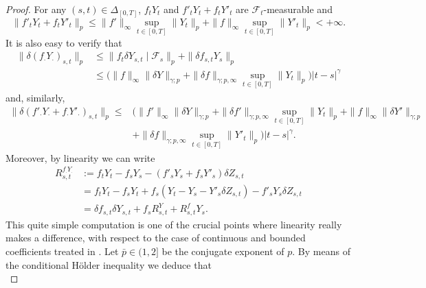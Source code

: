 \documentclass[11pt,a4paper]{article}
\theoremstyle{plain}
\begin{document}
\begin{proof} For any $(s,t) \in \Delta_{[0,T]}$, $f_tY_t$ and $f'_tY_t+f_tY'_t$ are $\mathcal{F}_t$-measurable and
\begin{equation} \label{eq:esttimateforapriori1}
    \|f'_tY_t+f_tY'_t\|_p \le \|f'\|_\infty \sup_{t\in [0,T]}\|Y_t\|_p + \|f\|_\infty \sup_{t\in [0,T]}\|Y'_t\|_p < +\infty.
\end{equation} 
It is also easy to verify that \begin{equation}\begin{aligned} \label{eq:esttimateforapriori2}
     \|\delta(f_\cdot Y_\cdot)_{s,t} \|_p &\le \|f_t\delta Y_{s,t} \mid \mathcal{F}_s \|_p + \|\delta f_{s,t} Y_s\|_p \\ &\le \big(\|f\|_\infty \|\delta Y\|_{\gamma;p}  + \|\delta f\|_{\gamma;p,\infty} \sup_{t\in [0,T]}\|Y_t\|_p\big) |t-s|^\gamma
\end{aligned}
\end{equation} and, similarly, \begin{equation} \label{eq:esttimateforapriori3}
    \begin{aligned}
        \|\delta(f'_\cdot Y_\cdot + f_\cdot Y'_\cdot)_{s,t}\|_p 
        \le & \Big(\|f'\|_\infty \|\delta Y\|_{\gamma;p} + \|\delta f'\|_{\gamma;p,\infty} \sup_{t\in [0,T]}\|Y_t\|_p +  \|f\|_\infty \|\delta Y'\|_{\gamma;p}  \\ & + \|\delta f\|_{\gamma;p,\infty} \sup_{t\in [0,T]}\|Y'_t\|_p\Big) |t-s|^\gamma.
    \end{aligned}
\end{equation} Moreover, by linearity we can write \begin{equation} \label{eq:remaindercompositionwithstochasticcontrolledlinearvectorfields}
    \begin{aligned}
        R_{s,t}^{f_\cdot Y_\cdot}&:= f_tY_t-f_sY_s-(f'_s Y_s+f_sY'_s)\delta Z_{s,t} \\ 
        &= f_tY_t-f_sY_t+f_s(Y_t-Y_s-Y'_s\delta Z_{s,t})-f'_sY_s\delta Z_{s,t} \\  
        &= \delta f_{s,t} \delta Y_{s,t} +f_sR^Y_{s,t} +R^{f}_{s,t}Y_s.
    \end{aligned}
\end{equation}
This quite simple computation is one of the crucial points where linearity really makes a difference, with respect to the case of continuous and bounded coefficients treated in \cite{FHL21}.
Let $\bar{p} \in (1,2]$ be the conjugate exponent of $p$. By means of the conditional Hölder inequality we deduce that \begin{equation*}

\end{equation*}
\end{proof}
\end{document}
